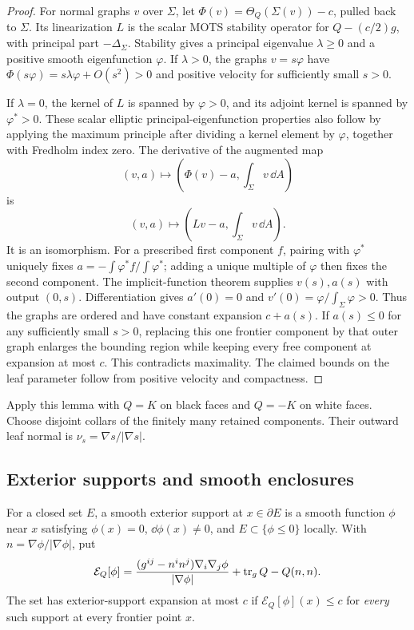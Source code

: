 \begin{proof}
For normal graphs \(v\) over \(\Sigma\), let
\(\Phi(v)=\Theta_Q(\Sigma(v))-c\), pulled back to \(\Sigma\).
Its linearization \(L\) is the scalar MOTS stability operator for
\(Q-(c/2)g\), with principal part \(-\Delta_\Sigma\).
Stability gives a principal eigenvalue \(\lambda\ge0\) and a positive
smooth eigenfunction \(\varphi\).  If \(\lambda>0\), the graphs
\(v=s\varphi\) have
\(\Phi(s\varphi)=s\lambda\varphi+O(s^2)>0\) and positive velocity
for sufficiently small \(s>0\).

If \(\lambda=0\), the kernel of \(L\) is spanned by \(\varphi>0\),
and its adjoint kernel is spanned by \(\varphi^*>0\).
These scalar elliptic principal-eigenfunction properties also follow
by applying the maximum principle after dividing a kernel element by
\(\varphi\), together with Fredholm index zero.  The derivative of the
augmented map
\[
 (v,a)\longmapsto
 \left(\Phi(v)-a,\int_\Sigma v\,\dd A\right)
\]
is
\[
 (v,a)\longmapsto
 \left(Lv-a,\int_\Sigma v\,\dd A\right).
\]
It is an isomorphism.  For a prescribed first component \(f\), pairing
with \(\varphi^*\) uniquely fixes
\(a=-\int\varphi^*f/\int\varphi^*\); adding a unique multiple of
\(\varphi\) then fixes the second component.  The implicit-function
theorem supplies \(v(s),a(s)\) with output \((0,s)\).
Differentiation gives \(a'(0)=0\) and
\(v'(0)=\varphi/\int_\Sigma\varphi>0\).
Thus the graphs are ordered and have constant expansion \(c+a(s)\).
If \(a(s)\le0\) for any sufficiently small \(s>0\), replacing this one
frontier component by that outer graph enlarges the bounding region
while keeping every free component at expansion at most \(c\).
This contradicts maximality.  The claimed bounds on the leaf
parameter follow from positive velocity and compactness.
\end{proof}

Apply this lemma with \(Q=K\) on black faces and \(Q=-K\) on white
faces.  Choose disjoint collars of the finitely many retained components.
Their outward leaf normal is \(\nu_s=\nabla s/\lvert\nabla s\rvert\).

\subsection{Exterior supports and smooth enclosures}
\label{subsec:fl-supports}

\begin{definition}
\label{def:fl-exterior-support}
For a closed set \(E\), a smooth exterior support at \(x\in\partial E\)
is a smooth function \(\phi\) near \(x\) satisfying
\(\phi(x)=0\), \(\dd\phi(x)\ne0\), and \(E\subset\{\phi\le0\}\)
locally.  With \(n=\nabla\phi/\lvert\nabla\phi\rvert\), put
\[
 \mathcal E_Q[\phi]
 =\frac{(g^{ij}-n^in^j)\nabla_i\nabla_j\phi}
         {\lvert\nabla\phi\rvert}
   +\operatorname{tr}_gQ-Q(n,n).
\]
The set has exterior-support expansion at most \(c\) if
\(\mathcal E_Q[\phi](x)\le c\) for \emph{every} such support at every
frontier point \(x\).
\end{definition}

